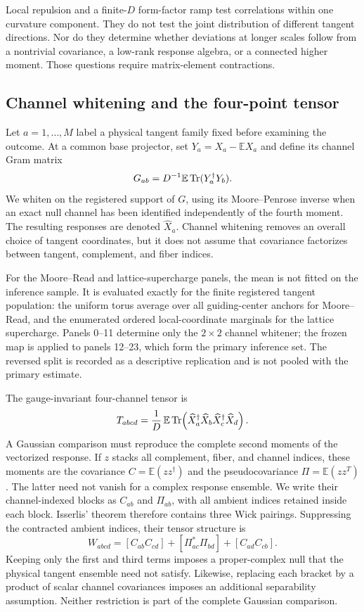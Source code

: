 Local repulsion and a finite-$D$ form-factor ramp test correlations within one
curvature component.  They do not test the joint distribution of different
tangent directions.  Nor do they determine whether deviations at longer
scales follow from a nontrivial covariance, a low-rank response algebra, or a
connected higher moment.  Those questions require matrix-element
contractions.

\subsection{Channel whitening and the four-point tensor}

Let $a=1,\ldots,M$ label a physical tangent family fixed before examining the
outcome.  At a common base projector, set
$Y_a=X_a-\mathbb E X_a$ and define its channel Gram matrix
\[
 G_{ab}=D^{-1}\mathbb E\operatorname{Tr}(Y_a^\dagger Y_b).
\]
We whiten on the registered support of $G$, using its Moore--Penrose inverse
when an exact null channel has been identified independently of the fourth
moment.  The resulting responses are denoted $\widehat X_a$.  Channel
whitening removes an overall choice of tangent coordinates, but it does not
assume that covariance factorizes between tangent, complement, and fiber
indices.

For the Moore--Read and lattice-supercharge panels, the mean is not fitted on
the inference sample.  It is evaluated exactly for the finite registered
tangent population: the uniform torus average over all guiding-center anchors
for Moore--Read, and the enumerated ordered local-coordinate marginals for the
lattice supercharge.  Panels 0--11 determine only the $2\times2$ channel
whitener; the frozen map is applied to panels 12--23, which form the primary
inference set.  The reversed split is recorded as a descriptive replication
and is not pooled with the primary estimate.

The gauge-invariant four-channel tensor is
\begin{equation}
 T_{abcd}=\frac{1}{D}\,
 \mathbb E\operatorname{Tr}\!\left(
 \widehat X_a^\dagger\widehat X_b
 \widehat X_c^\dagger\widehat X_d
 \right).
 \label{eq:fourpoint}
\end{equation}
A Gaussian comparison must reproduce the complete second moments of the
vectorized response.  If $z$ stacks all complement, fiber, and channel indices,
these moments are the covariance $C=\mathbb E(zz^\dagger)$ and the
pseudocovariance $\Pi=\mathbb E(zz^T)$.  The latter need not vanish for a
complex response ensemble.  We write their channel-indexed blocks as
$C_{ab}$ and $\Pi_{ab}$, with all ambient indices retained inside each block.
Isserlis' theorem therefore contains three Wick
pairings.  Suppressing the contracted ambient indices, their tensor structure
is
\[
 W_{abcd}=[C_{ab}C_{cd}]
 +[\Pi_{ac}^{*}\Pi_{bd}]
 +[C_{ad}C_{cb}].
\]
Keeping only the first and third terms imposes a proper-complex null that the
physical tangent ensemble need not satisfy.  Likewise, replacing each bracket
by a product of scalar channel covariances imposes an additional separability
assumption.  Neither restriction is part of the complete Gaussian comparison.


